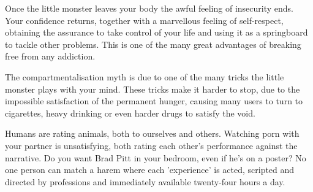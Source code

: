 \documentclass[easypeasy.tex]{subfiles}
\begin{document}
Once the little monster leaves your body the awful feeling of insecurity ends. Your confidence returns, together with a marvellous feeling of self-respect, obtaining the assurance to take control of your life and using it as a springboard to tackle other problems. This is one of the many great advantages of breaking free from any addiction.

The compartmentalisation myth is due to one of the many tricks the little monster plays with your mind. These tricks make it harder to stop, due to the impossible satisfaction of the permanent hunger, causing many users to turn to cigarettes, heavy drinking or even harder drugs to satisfy the void.

Humans are rating animals, both to ourselves and others. Watching porn with your partner is unsatisfying, both rating each other's performance against the narrative. Do you want Brad Pitt in your bedroom, even if he's on a poster? No one person can match a harem where each 'experience' is acted, scripted and directed by professions and immediately available twenty-four hours a day.
\end{document}

